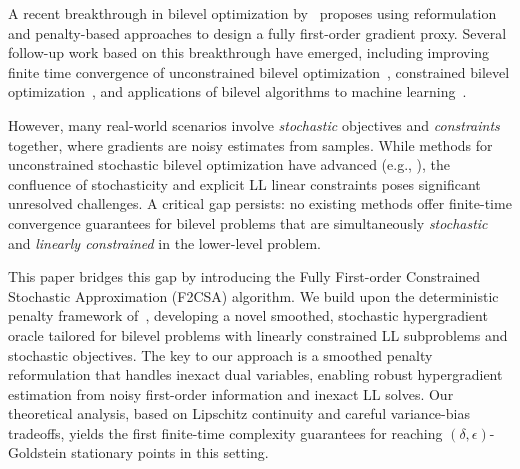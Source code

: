 \documentclass[letterpaper]{article} %
\newcommand{\1}{\mathbf{1}}
\begin{document}
A recent breakthrough in bilevel optimization by~\cite{kwon2023,liu2022bome} proposes using reformulation and penalty-based approaches to design a fully first-order gradient proxy.
Several follow-up work based on this breakthrough have emerged, including improving finite time convergence of unconstrained bilevel optimization~\cite{chen2024finding,yang2023achieving,chen2024optimal,kwon2024complexity}, constrained bilevel optimization~\cite{khanduri2023linearly,kornowski2024,yao2024constrained,lu2024first}, and applications of bilevel algorithms to machine learning~\cite{pan2024scalebio,zhang2024introduction,petrulionyte2024functional}.

However, many real-world scenarios involve \textit{stochastic} objectives and \textit{constraints} together, where gradients are noisy estimates from samples. While methods for unconstrained stochastic bilevel optimization have advanced (e.g., \cite{ghadimi2018approximation, kwon2023,liu2022bome}), the confluence of stochasticity and explicit LL linear constraints poses significant unresolved challenges. %
A critical gap persists: no existing methods offer finite-time convergence guarantees for bilevel problems that are simultaneously \textit{stochastic} and \textit{linearly constrained} in the lower-level problem.

This paper bridges this gap by introducing the Fully First-order Constrained Stochastic Approximation (F2CSA) algorithm. We build upon the deterministic penalty framework of~\cite{kornowski2024}, developing a novel smoothed, stochastic hypergradient oracle tailored for bilevel problems with linearly constrained LL subproblems and stochastic objectives. The key to our approach is a smoothed penalty reformulation that handles inexact dual variables, enabling robust hypergradient estimation from noisy first-order information and inexact LL solves. Our theoretical analysis, based on Lipschitz continuity and careful variance-bias tradeoffs, yields the first finite-time complexity guarantees for reaching $(\delta,\epsilon)$-Goldstein stationary points in this setting.
\end{document}
